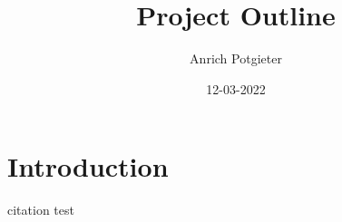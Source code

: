\documentclass[12pt]{article}
\title{Project Outline}
\author{Anrich Potgieter}
\date{12-03-2022}
\begin{document}
\maketitle
\section{Introduction}
citation test \autocite{ApplicabilityAppropriatenessDistributed} 
\printbibliography
\end{document}
